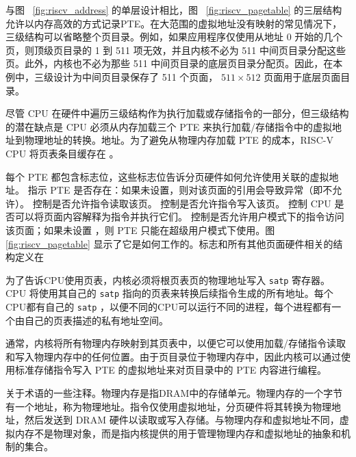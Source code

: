 \documentclass[UTF8]{article}
\begin{document}
与图~    \ref{fig:riscv_address}    的单层设计相比，图~    \ref{fig:riscv_pagetable}    的三层结构允许以内存高效的方式记录PTE。在大范围的虚拟地址没有映射的常见情况下，三级结构可以省略整个页目录。例如，如果应用程序仅使用从地址 0 开始的几个页，则顶级页目录的 1 到 511 项无效，并且内核不必为 511 中间页目录分配这些页。此外，内核也不必为那些 511 中间页目录的底层页目录分配页。因此，在本例中，三级设计为中间页目录保存了 511 个页面，
    $511\times512$    页面用于底层页面目录。  

尽管 CPU 在硬件中遍历三级结构作为执行加载或存储指令的一部分，但三级结构的潜在缺点是 CPU 必须从内存加载三个 PTE 来执行加载/存储指令中的虚拟地址到物理地址的转换。地址。为了避免从物理内存加载 PTE 的成本，RISC-V CPU 将页表条目缓存在
        。  

每个 PTE 都包含标志位，这些标志位告诉分页硬件如何允许使用关联的虚拟地址。
        指示 PTE 是否存在：如果未设置，则对该页面的引用会导致异常（即不允许）。
        控制是否允许指令读取该页。
        控制是否允许指令写入该页。
        控制 CPU 是否可以将页面内容解释为指令并执行它们。
        控制是否允许用户模式下的指令访问该页面；如果未设置       ，则 PTE 只能在超级用户模式下使用。图~    \ref{fig:riscv_pagetable}    显示了它是如何工作的。标志和所有其他页面硬件相关的结构定义在

为了告诉CPU使用页表，内核必须将根页表页的物理地址写入
    \texttt{satp}           寄存器。 CPU 将使用其自己的    \texttt{satp}    指向的页表来转换后续指令生成的所有地址。每个CPU都有自己的   \texttt{satp}   ，以便不同的CPU可以运行不同的进程，每个进程都有一个由自己的页表描述的私有地址空间。  

通常，内核将所有物理内存映射到其页表中，以便它可以使用加载/存储指令读取和写入物理内存中的任何位置。由于页目录位于物理内存中，因此内核可以通过使用标准存储指令写入 PTE 的虚拟地址来对页目录中的 PTE 内容进行编程。  

关于术语的一些注释。物理内存是指DRAM中的存储单元。物理内存的一个字节有一个地址，称为物理地址。指令仅使用虚拟地址，分页硬件将其转换为物理地址，然后发送到 DRAM 硬件以读取或写入存储。与物理内存和虚拟地址不同，虚拟内存不是物理对象，而是指内核提供的用于管理物理内存和虚拟地址的抽象和机制的集合。  
\end{document}
